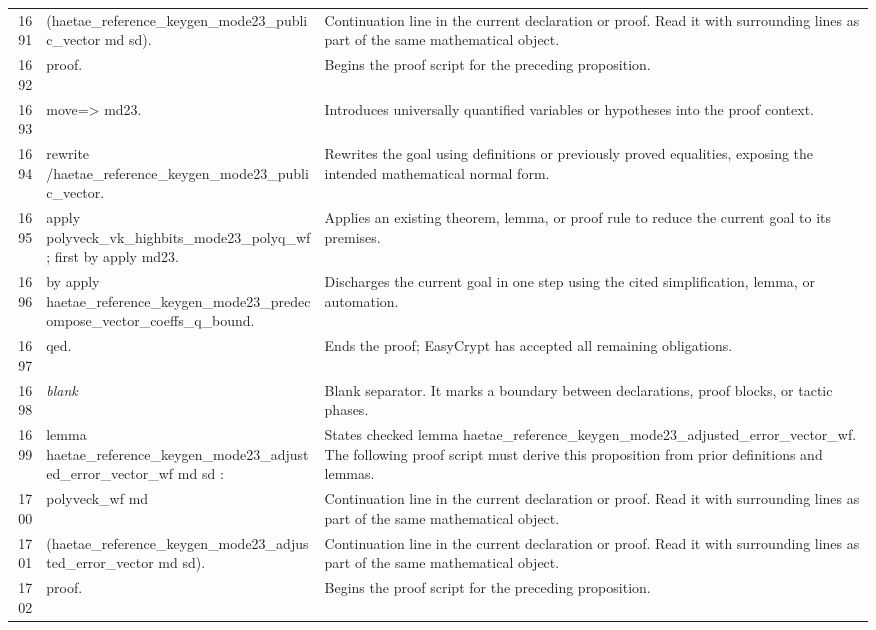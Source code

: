 \documentclass[10pt]{article}
\begin{document}
\begin{longtable}{r L{0.53\textwidth} L{0.37\textwidth}}
1691 & {\ttfamily\scriptsize     (haetae\_reference\_keygen\_mode23\_public\_vector md sd).} & Continuation line in the current declaration or proof.  Read it with surrounding lines as part of the same mathematical object. \\
1692 & {\ttfamily\scriptsize proof.} & Begins the proof script for the preceding proposition. \\
1693 & {\ttfamily\scriptsize move=> md23.} & Introduces universally quantified variables or hypotheses into the proof context. \\
1694 & {\ttfamily\scriptsize rewrite /haetae\_reference\_keygen\_mode23\_public\_vector.} & Rewrites the goal using definitions or previously proved equalities, exposing the intended mathematical normal form. \\
1695 & {\ttfamily\scriptsize apply polyveck\_vk\_highbits\_mode23\_polyq\_wf; first by apply md23.} & Applies an existing theorem, lemma, or proof rule to reduce the current goal to its premises. \\
1696 & {\ttfamily\scriptsize by apply haetae\_reference\_keygen\_mode23\_predecompose\_vector\_coeffs\_q\_bound.} & Discharges the current goal in one step using the cited simplification, lemma, or automation. \\
1697 & {\ttfamily\scriptsize qed.} & Ends the proof; EasyCrypt has accepted all remaining obligations. \\
1698 & {\ttfamily\scriptsize \emph{blank}} & Blank separator.  It marks a boundary between declarations, proof blocks, or tactic phases. \\
1699 & {\ttfamily\scriptsize lemma haetae\_reference\_keygen\_mode23\_adjusted\_error\_vector\_wf md sd :} & States checked lemma haetae\_reference\_keygen\_mode23\_adjusted\_error\_vector\_wf.  The following proof script must derive this proposition from prior definitions and lemmas. \\
1700 & {\ttfamily\scriptsize   polyveck\_wf md} & Continuation line in the current declaration or proof.  Read it with surrounding lines as part of the same mathematical object. \\
1701 & {\ttfamily\scriptsize     (haetae\_reference\_keygen\_mode23\_adjusted\_error\_vector md sd).} & Continuation line in the current declaration or proof.  Read it with surrounding lines as part of the same mathematical object. \\
1702 & {\ttfamily\scriptsize proof.} & Begins the proof script for the preceding proposition. \\

\end{longtable}
\end{document}
